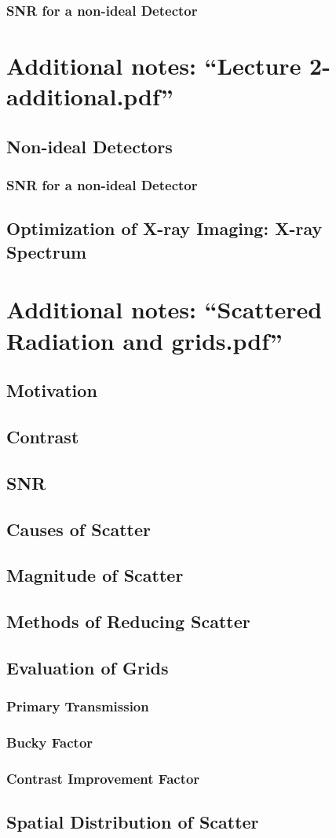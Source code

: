 \documentclass[11pt]{article}
\begin{document}
\subsubsection{SNR for a non-ideal Detector}

\newpage
\section{Additional notes: ``Lecture 2-additional.pdf''}
\subsection{Non-ideal Detectors}
\subsubsection{SNR for a non-ideal Detector}
\subsection{Optimization of X-ray Imaging: X-ray Spectrum}

\newpage
\section{Additional notes: ``Scattered Radiation and grids.pdf''}
\subsection{Motivation}
\subsection{Contrast}
\subsection{SNR}
\subsection{Causes of Scatter}
\subsection{Magnitude of Scatter}
\subsection{Methods of Reducing Scatter}
\subsection{Evaluation of Grids}
\subsubsection{Primary Transmission}
\subsubsection{Bucky Factor}
\subsubsection{Contrast Improvement Factor}
\subsection{Spatial Distribution of Scatter}
\end{document}
